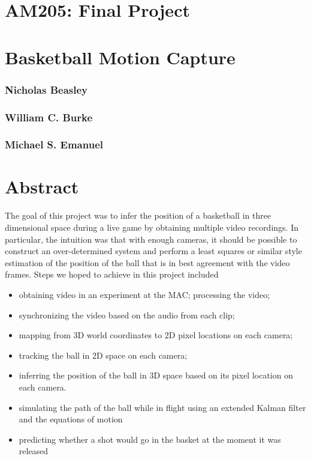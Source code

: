 \documentclass{article}
\begin{document}
\section*{AM205: Final Project}
\section*{Basketball Motion Capture}
\subsubsection*{Nicholas Beasley}
\subsubsection*{William C. Burke}
\subsubsection*{Michael S. Emanuel}

\section{Abstract}
The goal of this project was to infer the position of a basketball in three dimensional space during a live game by obtaining multiple video recordings.
In particular, the intuition was that with enough cameras, it should be possible to construct an over-determined system and perform 
a least squares or similar style estimation of the position of the ball that is in best agreement with the video frames.
Steps we hoped to achieve in this project included 
\begin{itemize}
\item obtaining video in an experiment at the MAC; processing the video; 
\item synchronizing the video based on the audio from each clip; 
\item mapping from 3D world coordinates to 2D pixel locations on each camera;
\item tracking the ball in 2D space on each camera; 
\item inferring the position of the ball in 3D space based on its pixel location on each camera.
\item simulating the path of the ball while in flight using an extended Kalman filter and the equations of motion
\item predicting whether a shot would go in the basket at the moment it was released
\end{itemize}
\end{document}
